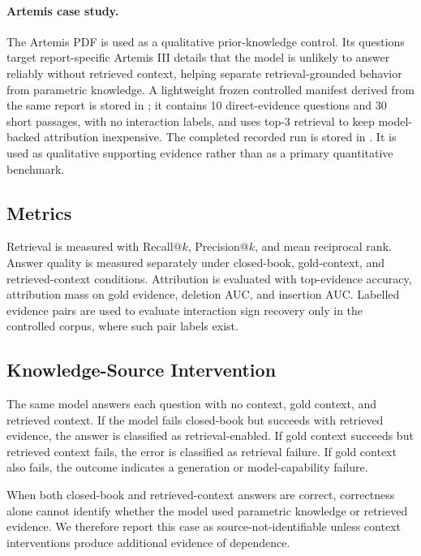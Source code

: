 \documentclass[10pt]{article}
\begin{document}
\paragraph{Artemis case study.}
The Artemis PDF is used as a qualitative prior-knowledge control. Its questions
target report-specific Artemis III details that the model is unlikely to answer
reliably without retrieved context, helping separate retrieval-grounded behavior
from parametric knowledge.
A lightweight frozen controlled manifest derived from the same report is stored
in ; it contains 10
direct-evidence questions and 30 short passages, with no interaction labels, and
uses top-$3$ retrieval to keep model-backed attribution inexpensive. The
completed recorded run is stored in
. It is used
as qualitative supporting evidence rather than as a primary quantitative
benchmark.

\subsection{Metrics}
Retrieval is measured with Recall@$k$, Precision@$k$, and mean reciprocal rank.
Answer quality is measured separately under closed-book, gold-context, and
retrieved-context conditions. Attribution is evaluated with top-evidence
accuracy, attribution mass on gold evidence, deletion AUC, and insertion AUC.
Labelled evidence pairs are used to evaluate interaction sign recovery only in
the controlled corpus, where such pair labels exist.

\subsection{Knowledge-Source Intervention}
The same model answers each question with no context, gold context, and
retrieved context. If the model fails closed-book but succeeds with retrieved
evidence, the answer is classified as retrieval-enabled. If gold context
succeeds but retrieved context fails, the error is classified as retrieval
failure. If gold context also fails, the outcome indicates a generation or
model-capability failure.

When both closed-book and retrieved-context answers are correct, correctness
alone cannot identify whether the model used parametric knowledge or retrieved
evidence. We therefore report this case as source-not-identifiable unless
context interventions produce additional evidence of dependence.
\end{document}
